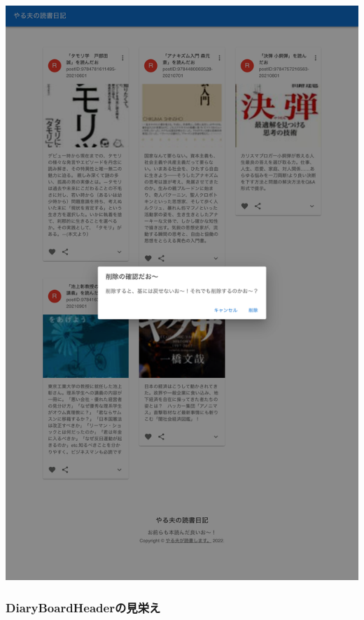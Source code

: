 \begin{reviewimage}%
\includegraphics[width=0.7\maxwidth]{./images/03-todo-with-react/mui014-card-deleteDialog-done.png}%
\label{image:03-todo-with-react:mui014-card-deleteDialog-done}
\end{reviewimage}

\subsubsection*{DiaryBoardHeaderの見栄え}
\keeplastskip{
  \label{sec:3-3-6-2}
  \label{sec-0336-2}
  \par\nobreak
}

